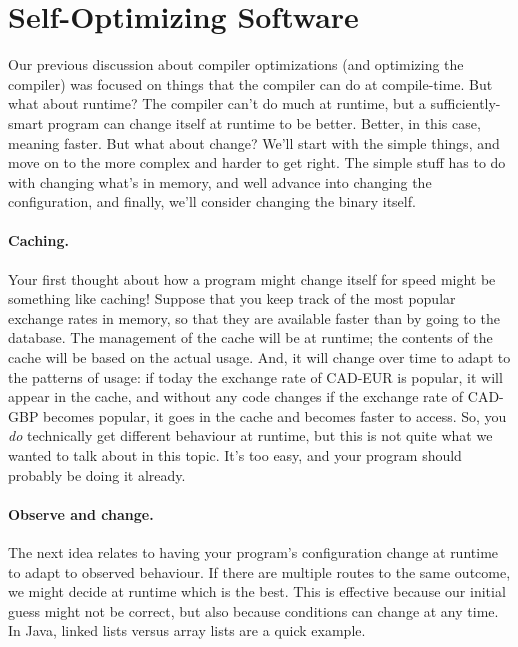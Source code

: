 




\section*{Self-Optimizing Software}
Our previous discussion about compiler optimizations (and optimizing the compiler) was focused on things that the compiler can do at compile-time. But what about runtime? The compiler can't do much at runtime, but a sufficiently-smart program can change itself at runtime to be better. Better, in this case, meaning faster. But what about change? We'll start with the simple things, and move on to the more complex  and harder to get right. The simple stuff has to do with changing what's in memory, and well advance into changing the configuration, and finally, we'll consider changing the binary itself.

\paragraph{Caching.} Your first thought about how a program might change itself for speed might be something like caching! Suppose that you keep track of the most popular exchange rates in memory, so that they are available faster than by going to the database. The management of the cache will be at runtime; the contents of the cache will be based on the actual usage. And, it will change over time to adapt to the patterns of usage: if today the exchange rate of CAD-EUR is popular, it will appear in the cache, and without any code changes if the exchange rate of CAD-GBP becomes popular, it goes in the cache and becomes faster to access. So, you \textit{do} technically get different behaviour at runtime, but this is not quite what we wanted to talk about in this topic. It's too easy, and your program should probably be doing it already.

\paragraph{Observe and change.}
The next idea relates to having your program's configuration change at runtime to adapt to observed behaviour. If there are multiple routes to the same outcome, we might decide at runtime which is the best. This is effective because our initial guess might not be correct, but also because conditions can change at any time. In Java, linked lists versus array lists are a quick example.

